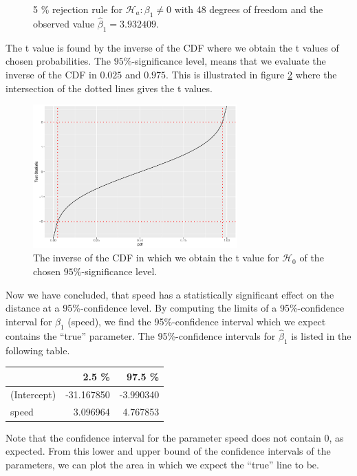 \begin{example} 
\begin{figure}[H]
    \caption{5 \% rejection rule for $\mathcal{H}_a:\beta_1\neq0$ with 48 degrees of freedom and the observed value $\hat{\beta}_1=3.932409$.}
    \label{fig:t_distributionplot1}
\end{figure}
The t value is found by the inverse of the CDF where we obtain the t values of chosen probabilities. 
The $95\%$-significance level, means that we evaluate the inverse of the CDF in $0.025$ and $0.975$. 
This is illustrated in figure \ref{fig:CDF_inverse} where the intersection of the dotted lines gives the t values.
\begin{figure}[H]
    \centering
    \includegraphics[width = 0.7\textwidth]{figures/Nanna/CDF_inverse.pdf}
    \caption{The inverse of the CDF in which we obtain the t value for $\mathcal{H}_0$ of the chosen $95\%$-significance level.}
    \label{fig:CDF_inverse}
\end{figure}
Now we have concluded, that speed has a statistically significant effect on the distance at a 95\%-confidence level. 
By computing the limits of a 95\%-confidence interval for $\hat{\beta}_1$ (speed), we find the 95\%-confidence interval which we expect contains the ``true'' parameter.
The 95\%-confidence intervals for $\hat{\beta}_1$ is listed in the following table.
\begin{table}[H]
\centering
\begin{tabular}{lrr}
\toprule
 & \textbf{2.5 \%} & \textbf{97.5 \%}\\
\midrule
(Intercept) & -31.167850 & -3.990340\\
speed & 3.096964 & 4.767853\\
\bottomrule
\end{tabular}
\end{table}
Note that the confidence interval for the parameter speed does not contain 0, as expected.
From this lower and upper bound of the confidence intervals of the parameters, we can plot the area in which we expect the ``true'' line to be. 

\end{example}

